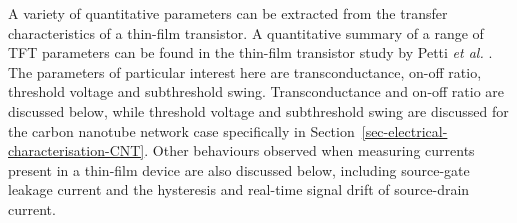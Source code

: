 \documentclass[
  a4paper,
]{scrbook}
\begin{document}
A variety of quantitative parameters can be extracted from the transfer
characteristics of a thin-film transistor. A quantitative summary of a
range of TFT parameters can be found in the thin-film transistor study
by Petti \emph{et al.} \autocite{Petti2016}. The parameters of
particular interest here are transconductance, on-off ratio, threshold
voltage and subthreshold swing. Transconductance and on-off ratio are
discussed below, while threshold voltage and subthreshold swing are
discussed for the carbon nanotube network case specifically in
Section~\ref{sec-electrical-characterisation-CNT}. Other behaviours
observed when measuring currents present in a thin-film device are also
discussed below, including source-gate leakage current and the
hysteresis and real-time signal drift of source-drain current.

\begin{figure}

\begin{minipage}[t]{0.03\linewidth}

{\centering 


}

\end{minipage}%
%
\begin{minipage}[t]{0.01\linewidth}

{\centering 

~

}

\end{minipage}%
%
\begin{minipage}[t]{0.45\linewidth}

{\centering 

}
\end{minipage}
\end{figure}
\end{document}

